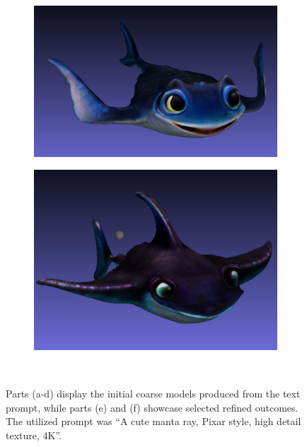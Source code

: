 \begin{figure}[H]
    \begin{subfigure}[b]{0.5\textwidth}
        \centering
        \includegraphics[width=\textwidth]{figures/future/manta_refine_2.png}
        \caption{}
    \end{subfigure}
    \begin{subfigure}[b]{0.42\textwidth}
        \centering
        \includegraphics[width=\textwidth]{figures/future/manta_refine_4.png}
        \caption{}
    \end{subfigure}
    \caption{Parts (a-d) display the initial coarse models produced from the text prompt, while parts (e) and (f) showcase selected refined outcomes. The utilized prompt was ``A cute manta ray, Pixar style, high detail texture, 4K''.}~\label{fig:GenieAI_manta}

\end{figure}


